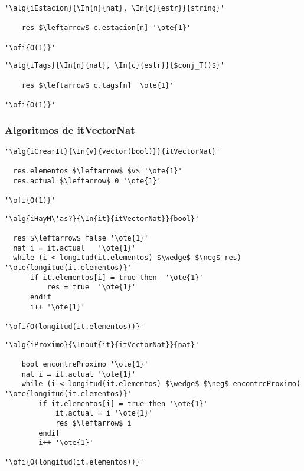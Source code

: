 \begin{lstlisting}[mathescape]
'\alg{iEstacion}{\In{n}{nat}, \In{c}{estr}}{string}'

    res $\leftarrow$ c.estacion[n] '\ote{1}'
  
'\ofi{O(1)}'
\end{lstlisting}

\begin{lstlisting}[mathescape]
'\alg{iTags}{\In{n}{nat}, \In{c}{estr}}{$conj_T()$}'

    res $\leftarrow$ c.tags[n] '\ote{1}'
  
'\ofi{O(1)}'
\end{lstlisting}

\subsubsection{Algoritmos de itVectorNat}

\begin{lstlisting}[mathescape]
'\alg{iCrearIt}{\In{v}{vector(bool)}}{itVectorNat}'

  res.elementos $\leftarrow$ $v$ '\ote{1}' 
  res.actual $\leftarrow$ 0 '\ote{1}'
  
'\ofi{O(1)}'
\end{lstlisting}

\begin{lstlisting}[mathescape]
'\alg{iHayM\'as?}{\In{it}{itVectorNat}}{bool}'

  res $\leftarrow$ false '\ote{1}' 
  nat i = it.actual   '\ote{1}' 
  while (i < longitud(it.elementos) $\wedge$ $\neg$ res)   '\ote{longitud(it.elementos)}'
      if it.elementos[i] = true then  '\ote{1}'
          res = true  '\ote{1}'
      endif
      i++ '\ote{1}'
  
'\ofi{O(longitud(it.elementos))}'
\end{lstlisting}

\begin{lstlisting}[mathescape]
'\alg{iProximo}{\Inout{it}{itVectorNat}}{nat}'

    bool encontreProximo '\ote{1}'
    nat i = it.actual '\ote{1}'
    while (i < longitud(it.elementos) $\wedge$ $\neg$ encontreProximo)  '\ote{longitud(it.elementos)}'
        if it.elementos[i] = true then '\ote{1}'
            it.actual = i '\ote{1}'
            res $\leftarrow$ i
        endif
        i++ '\ote{1}'
  
'\ofi{O(longitud(it.elementos))}'
\end{lstlisting}
